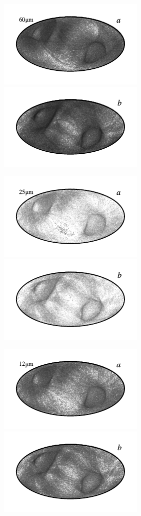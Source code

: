 \documentclass{aa}
\begin{document}
\begin{figure}
	\includegraphics{figs/rms_maps/rms_07a_c0001_000019.pdf}\includegraphics{figs/rms_maps/rms_07b_c0001_000019.pdf}
  \vspace*{-0.85cm}

	\includegraphics{figs/rms_maps/rms_06a_c0001_000019.pdf}\includegraphics{figs/rms_maps/rms_06b_c0001_000019.pdf}
  \vspace*{-0.85cm}

	\includegraphics{figs/rms_maps/rms_05a_c0001_000019.pdf}\includegraphics{figs/rms_maps/rms_05b_c0001_000019.pdf}
  \vspace*{-0.85cm}


\end{figure}
\end{document}
